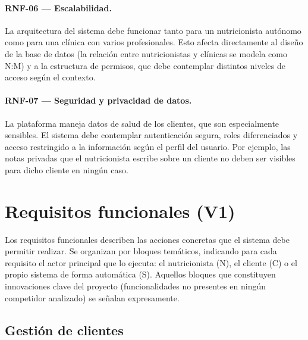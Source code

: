 \paragraph{RNF-06 --- Escalabilidad.}
La arquitectura del sistema debe funcionar tanto para un nutricionista autónomo como para una clínica con varios profesionales. Esto afecta directamente al diseño de la base de datos (la relación entre nutricionistas y clínicas se modela como N:M) y a la estructura de permisos, que debe contemplar distintos niveles de acceso según el contexto.

\paragraph{RNF-07 --- Seguridad y privacidad de datos.}
La plataforma maneja datos de salud de los clientes, que son especialmente sensibles. El sistema debe contemplar autenticación segura, roles diferenciados y acceso restringido a la información según el perfil del usuario. Por ejemplo, las notas privadas que el nutricionista escribe sobre un cliente no deben ser visibles para dicho cliente en ningún caso.


\section{Requisitos funcionales (V1)}
\label{sec:rf-v1}

Los requisitos funcionales describen las acciones concretas que el sistema debe permitir realizar. Se organizan por bloques temáticos, indicando para cada requisito el actor principal que lo ejecuta: el nutricionista (N), el cliente (C) o el propio sistema de forma automática (S). Aquellos bloques que constituyen innovaciones clave del proyecto (funcionalidades no presentes en ningún competidor analizado) se señalan expresamente.

\subsection{Gestión de clientes}

